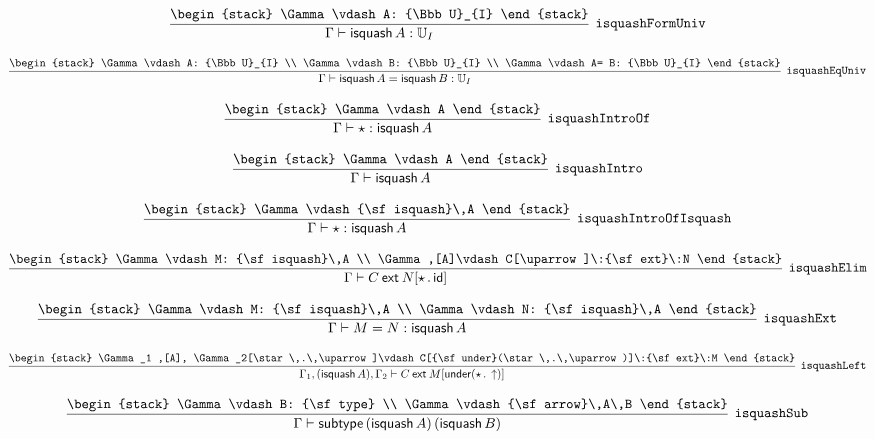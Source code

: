 \[
\infer[{\tt isquashFormUniv}]{\Gamma \vdash {\sf isquash}\,A: {\Bbb U}_{I}}{
\begin{stack}
\Gamma \vdash A: {\Bbb U}_{I}
\end{stack}}
\]

\[
\infer[{\tt isquashEqUniv}]{\Gamma \vdash {\sf isquash}\,A= {\sf isquash}\,B: {\Bbb U}_{I}}{
\begin{stack}
\Gamma \vdash A: {\Bbb U}_{I}
\\
\Gamma \vdash B: {\Bbb U}_{I}
\\
\Gamma \vdash A= B: {\Bbb U}_{I}
\end{stack}}
\]

\[
\infer[{\tt isquashIntroOf}]{\Gamma \vdash \star : {\sf isquash}\,A}{
\begin{stack}
\Gamma \vdash A
\end{stack}}
\]

\[
\infer[{\tt isquashIntro}]{\Gamma \vdash {\sf isquash}\,A}{
\begin{stack}
\Gamma \vdash A
\end{stack}}
\]

\[
\infer[{\tt isquashIntroOfIsquash}]{\Gamma \vdash \star : {\sf isquash}\,A}{
\begin{stack}
\Gamma \vdash {\sf isquash}\,A
\end{stack}}
\]

\[
\infer[{\tt isquashElim}]{\Gamma \vdash C\:{\sf ext}\:N[\star \,.\,{\sf id}]}{
\begin{stack}
\Gamma \vdash M: {\sf isquash}\,A
\\
\Gamma ,[A]\vdash C[\uparrow ]\:{\sf ext}\:N
\end{stack}}
\]

\[
\infer[{\tt isquashExt}]{\Gamma \vdash M= N: {\sf isquash}\,A}{
\begin{stack}
\Gamma \vdash M: {\sf isquash}\,A
\\
\Gamma \vdash N: {\sf isquash}\,A
\end{stack}}
\]

\[
\infer[{\tt isquashLeft}]{\Gamma_1 ,({\sf isquash}\,A), \Gamma_2 \vdash C\:{\sf ext}\:M[{\sf under}(\star \,.\,\uparrow )]}{
\begin{stack}
\Gamma_1 ,[A], \Gamma_2[\star \,.\,\uparrow ]\vdash C[{\sf under}(\star \,.\,\uparrow )]\:{\sf ext}\:M
\end{stack}}
\]

\[
\infer[{\tt isquashSub}]{\Gamma \vdash {\sf subtype}\,({\sf isquash}\,A)\,({\sf isquash}\,B)}{
\begin{stack}
\Gamma \vdash B: {\sf type}
\\
\Gamma \vdash {\sf arrow}\,A\,B
\end{stack}}
\]

